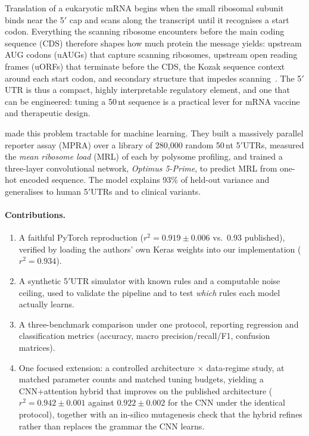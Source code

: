\documentclass{article}
\begin{document}
Translation of a eukaryotic mRNA begins when the small ribosomal subunit binds near the
5$'$ cap and scans along the transcript until it recognises a start codon. Everything the
scanning ribosome encounters before the main coding sequence (CDS) therefore shapes how much
protein the message yields: upstream AUG codons (uAUGs) that capture scanning ribosomes,
upstream open reading frames (uORFs) that terminate before the CDS, the Kozak sequence
context around each start codon, and secondary structure that impedes scanning~\citep{kozak1986}. The 5$'$UTR
is thus a compact, highly interpretable regulatory element, and one that can be engineered:
tuning a 50\,nt sequence is a practical lever for mRNA vaccine and therapeutic design.

\citet{sample2019} made this problem tractable for machine learning. They built a massively
parallel reporter assay (MPRA) over a library of 280{,}000 random 50\,nt 5$'$UTRs, measured
the \emph{mean ribosome load} (MRL) of each by polysome profiling, and trained a
three-layer convolutional network, \emph{Optimus 5-Prime}, to predict MRL from one-hot
encoded sequence. The model explains 93\% of held-out variance and generalises to human
5$'$UTRs and to clinical variants.

\paragraph{Contributions.}
\begin{enumerate}\itemsep2pt
\item A faithful PyTorch reproduction ($r^2=0.919\pm0.006$ vs.\ 0.93 published), verified by
loading the authors' own Keras weights into our implementation ($r^2=0.934$).
\item A synthetic 5$'$UTR simulator with known rules and a computable noise ceiling, used to
validate the pipeline and to test \emph{which} rules each model actually learns.
\item A three-benchmark comparison under one protocol, reporting regression and
classification metrics (accuracy, macro precision/recall/F1, confusion matrices).
\item One focused extension: a controlled architecture $\times$ data-regime study, at
matched parameter counts and matched tuning budgets, yielding a CNN+attention hybrid that
improves on the published architecture ($r^2=0.942\pm0.001$ against $0.922\pm0.002$ for the
CNN under the identical protocol), together with an in-silico mutagenesis check that the
hybrid refines rather than replaces the grammar the CNN learns.
\end{enumerate}
\end{document}
